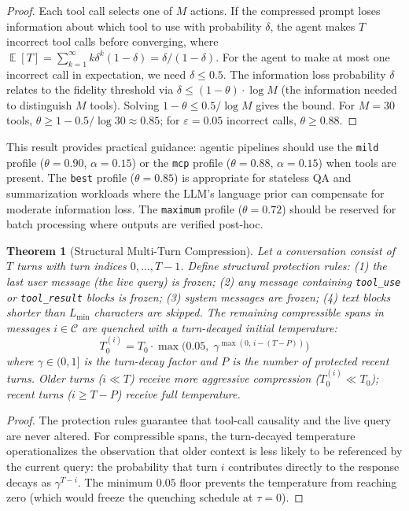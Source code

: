 \documentclass[11pt]{article}
\newtheorem{theorem}{Theorem}[section]
\theoremstyle{remark}
\DeclareMathOperator{\E}{\mathbb{E}}
\begin{document}
\begin{proof}
Each tool call selects one of $M$ actions. If the compressed prompt loses
information about which tool to use with probability $\delta$, the agent
makes $T$ incorrect tool calls before converging, where
$\E[T] = \sum_{k=1}^{\infty} k \delta^k (1-\delta) = \delta / (1-\delta)$.
For the agent to make at most one incorrect call in expectation, we need
$\delta \leq 0.5$. The information loss probability $\delta$ relates to
the fidelity threshold via $\delta \leq (1-\theta) \cdot \log M$ (the
information needed to distinguish $M$ tools). Solving $1-\theta \leq
0.5 / \log M$ gives the bound. For $M = 30$ tools,
$\theta \geq 1 - 0.5 / \log 30 \approx 0.85$; for $\varepsilon = 0.05$
incorrect calls, $\theta \geq 0.88$.
\end{proof}

This result provides practical guidance: agentic pipelines should use the
\texttt{mild} profile ($\theta = 0.90$, $\alpha = 0.15$) or the
\texttt{mcp} profile ($\theta = 0.88$, $\alpha = 0.15$) when tools are
present. The \texttt{best} profile ($\theta = 0.85$) is appropriate for
stateless QA and summarization workloads where the LLM's language prior
can compensate for moderate information loss. The \texttt{maximum} profile
($\theta = 0.72$) should be reserved for batch processing where outputs
are verified post-hoc.

\begin{theorem}[Structural Multi-Turn Compression]
\label{thm:structural-multi-turn}
Let a conversation consist of $T$ turns with turn indices $0, \ldots, T-1$.
Define structural protection rules: (1) the last user message (the live
query) is frozen; (2) any message containing \texttt{tool\_use} or
\texttt{tool\_result} blocks is frozen; (3) system messages are frozen;
(4) text blocks shorter than $L_{\min}$ characters are skipped. The
remaining compressible spans in messages $i \in \mathcal{C}$ are quenched
with a turn-decayed initial temperature:
\begin{equation}
    T_0^{(i)} = T_0 \cdot \max\big(0.05,\; \gamma^{\max(0,\, i - (T - P))}\big)
\end{equation}
where $\gamma \in (0, 1]$ is the turn-decay factor and $P$ is the number
of protected recent turns. Older turns ($i \ll T$) receive more aggressive
compression ($T_0^{(i)} \ll T_0$); recent turns ($i \geq T-P$) receive
full temperature.
\end{theorem}

\begin{proof}
The protection rules guarantee that tool-call causality and the live query
are never altered. For compressible spans, the turn-decayed temperature
operationalizes the observation that older context is less likely to be
referenced by the current query: the probability that turn $i$ contributes
directly to the response decays as $\gamma^{T-i}$. The minimum $0.05$
floor prevents the temperature from reaching zero (which would freeze
the quenching schedule at $\tau=0$).
\end{proof}
\end{document}
